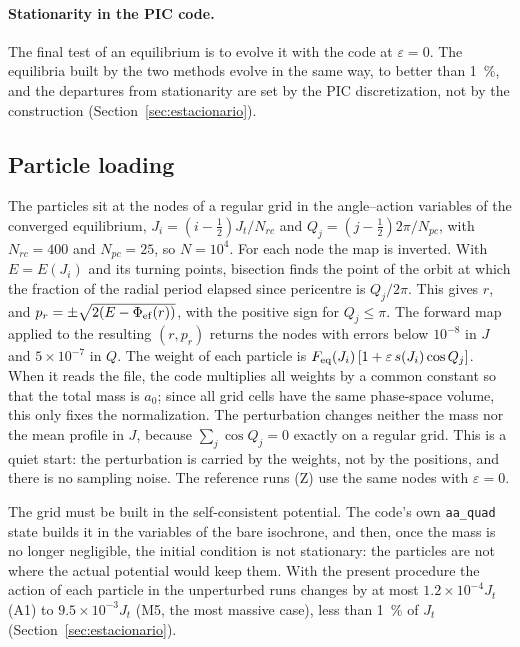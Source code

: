 \documentclass[11pt,a4paper]{article}
\begin{document}
\paragraph{Stationarity in the PIC code.} The final test of an equilibrium is to evolve it
with the code at $\varepsilon=0$. The equilibria built by the two methods evolve in the same
way, to better than \SI{1}{\%}, and the departures from stationarity are set by the PIC
discretization, not by the construction (Section~\ref{sec:estacionario}).

\subsection{Particle loading}
\label{sec:carga}

The particles sit at the nodes of a regular grid in the angle--action variables of the
converged equilibrium, $J_i=(i-\tfrac12)J_t/N_{rc}$ and $Q_j=(j-\tfrac12)2\pi/N_{pc}$, with
$N_{rc}=400$ and $N_{pc}=25$, so $N=10^4$. For each node the map is inverted. With
$E=E(J_i)$ and its turning points, bisection finds the point of the orbit at which the
fraction of the radial period elapsed since pericentre is $Q_j/2\pi$. This gives $r$,
and $p_r=\pm\sqrt{2(E-\Phi_{\rm ef}(r))}$, with the positive sign for $Q_j\le\pi$. The
forward map applied to the resulting $(r,p_r)$ returns the nodes with errors below
$10^{-8}$ in $J$ and $5\times10^{-7}$ in $Q$. The weight of each particle is
$F_{\rm eq}(J_i)\,[1+\varepsilon\,s(J_i)\cos Q_j]$. When it reads the file, the code
multiplies all weights by a common constant so that the total mass is $a_0$; since all
grid cells have the same phase-space volume, this only fixes the normalization. The
perturbation changes neither the mass nor the mean profile in $J$, because
$\sum_j\cos Q_j=0$ exactly on a regular grid. This is a quiet start: the perturbation is
carried by the weights, not by the positions, and there is no sampling noise. The
reference runs (Z) use the same nodes with $\varepsilon=0$.

The grid must be built in the self-consistent potential. The code's own \texttt{aa\_quad}
state builds it in the variables of the bare isochrone, and then, once the mass is no
longer negligible, the initial condition is not stationary: the particles are not
where the actual potential would keep them. With the present procedure the action of
each particle in the unperturbed runs changes by at most $1.2\times10^{-4}J_t$ (A1) to
$9.5\times10^{-3}J_t$ (M5, the most massive case), less than \SI{1}{\%} of $J_t$
(Section~\ref{sec:estacionario}).
\end{document}
